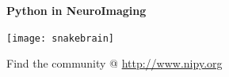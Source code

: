 




\begin{multicols}{3}    %

\begin{center}\Large \textbf{Python in NeuroImaging}\end{center}

\begin{center}
\noindent
\texttt{[image: snakebrain]}

Find the community @ \url{http://www.nipy.org}

\end{center}
\vspace{0em}







\end{multicols}
